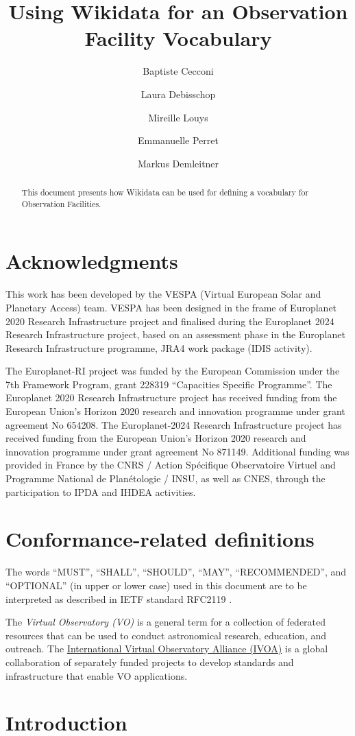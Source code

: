 \documentclass[11pt,a4paper]{ivoa}
\title{Using Wikidata for an Observation Facility Vocabulary}
\author[mailto:baptiste.cecconi@obspm.fr]{Baptiste Cecconi}
\author{Laura Debisschop}
\author{Mireille Louys}
\author{Emmanuelle Perret}
\author{Markus Demleitner}
\begin{document}
\begin{abstract}
This document presents how Wikidata can be used for defining a 
vocabulary for Observation Facilities. 
\end{abstract}


\section*{Acknowledgments}

This work has been developed by the VESPA (Virtual European Solar
and Planetary Access) team.  VESPA has been designed in the frame of
Europlanet 2020 Research Infrastructure project and finalised
during the Europlanet 2024 Research Infrastructure project,
based on an assessment phase in the Europlanet Research Infrastructure
 programme, JRA4 work package (IDIS activity).

The Europlanet-RI project was funded by the European Commission under the
7th Framework Program, grant 228319 ``Capacities Specific Programme''.
The Europlanet 2020 Research Infrastructure project has
received funding from the European Union's Horizon 2020 research and
innovation programme under grant agreement No 654208.  The Europlanet-2024
Research Infrastructure project has received funding from
the European Union's Horizon 2020 research and innovation programme under
grant agreement No 871149.  Additional funding was provided in France by
the CNRS / Action Sp\'ecifique Observatoire Virtuel and Programme National
de Plan\'etologie / INSU, as well as CNES, through the participation to
IPDA and IHDEA activities.

\section*{Conformance-related definitions}

The words ``MUST'', ``SHALL'', ``SHOULD'', ``MAY'', ``RECOMMENDED'', and
``OPTIONAL'' (in upper or lower case) used in this document are to be
interpreted as described in IETF standard RFC2119 \citep{std:RFC2119}.

The \emph{Virtual Observatory (VO)} is a
general term for a collection of federated resources that can be used
to conduct astronomical research, education, and outreach.
The \href{https://www.ivoa.net}{International
Virtual Observatory Alliance (IVOA)} is a global
collaboration of separately funded projects to develop standards and
infrastructure that enable VO applications.


\section{Introduction}
\end{document}
